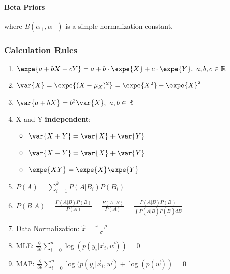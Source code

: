 \documentclass[8pt,a4paper]{scrartcl}
\begin{document}
\begin{multicols*}{3}

\paragraph{Beta Priors}


where $B(\alpha_+,\alpha_-)$ is a simple normalization constant.


\subsubsection*{Calculation Rules}

\begin{enumerate}
\ncompaq
\item $\expe{a+bX+cY}=a+b\cdot\expe{X}+c\cdot\expe{Y},\ a,b,c\in\mathbb{R}$

\item $\var{X}=\expe{(X-\mu_X)^2}=\expe{X^2}-\expe{X}^2$
\item $\var{a+bX}=b^2\var{X},\ a,b\in\mathbb{R}$
\item X and Y \textbf{independent}:
\begin{itemize}
\ncompaq
\item $\var{X+Y}=\var{X}+\var{Y}$
\item $\var{X-Y}=\var{X}+\var{Y}$
\item $\expe{XY}=\expe{X}\expe{Y}$
\end{itemize}
\item $P(A)=\sum\limits_{i=1}^kP(A|B_i)P(B_i)$
\item $P(B|A)=\frac{P(A|B)P(B)}{P(A)}=\frac{P(A,B)}{P(A)}=\frac{P(A|B)P(B)}{\int P(A|\tilde{B})P(\tilde{B})d\tilde{B}}$
\item Data Normalization: $\hat{x}=\frac{x-\mu}{\sigma}$
\item MLE: $\frac{\partial }{\partial \theta}\sum\limits_{i=0}^n\log(p(y_i|\vec{x}_i,\vec{w}))=0$
\item MAP: $\frac{\partial }{\partial \theta}\sum\limits_{i=0}^n\log(p(y_i|\vec{x}_i,\vec{w})+\log(p(\vec{w}))=0$
\end{enumerate}


\end{multicols*}
\end{document}
